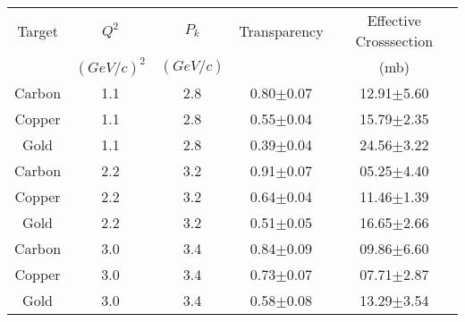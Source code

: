 \begin{center}
\begin{tabular}{||c|c|c|c|c||}\hline
 Target & $Q^2$ & $P_k$ & Transparency & Effective Crosssection \\
 & $(GeV/c)^2$ & $(GeV/c)$ & & (mb)\\\hline
Carbon & 1.1 & 2.8 & 0.80$\pm$0.07 &12.91$\pm$5.60 \\
Copper & 1.1 & 2.8 & 0.55$\pm$0.04 &15.79$\pm$2.35 \\
Gold   & 1.1 & 2.8 & 0.39$\pm$0.04 &24.56$\pm$3.22 \\\hline
Carbon & 2.2 & 3.2 & 0.91$\pm$0.07 &05.25$\pm$4.40 \\
Copper & 2.2 & 3.2 & 0.64$\pm$0.04 &11.46$\pm$1.39 \\
Gold   & 2.2 & 3.2 & 0.51$\pm$0.05 &16.65$\pm$2.66 \\\hline
Carbon & 3.0 & 3.4 & 0.84$\pm$0.09 &09.86$\pm$6.60 \\
Copper & 3.0 & 3.4 & 0.73$\pm$0.07 &07.71$\pm$2.87 \\
Gold   & 3.0 & 3.4 & 0.58$\pm$0.08 &13.29$\pm$3.54 \\\hline
\end{tabular}
\end{center}